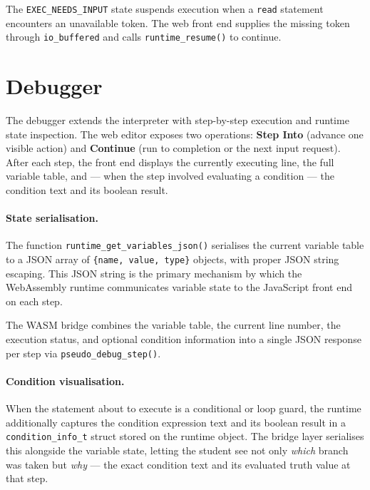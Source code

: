 The \texttt{EXEC\_NEEDS\_INPUT} state suspends execution when a \texttt{read}
statement encounters an unavailable token.  The web front end supplies the
missing token through \texttt{io\_buffered} and calls \texttt{runtime\_resume()}
to continue.

\section{Debugger}
\label{sec:debugger}

The debugger extends the interpreter with step-by-step execution and runtime
state inspection.  The web editor exposes two operations:
\textbf{Step Into} (advance one visible action) and \textbf{Continue} (run to
completion or the next input request).  After each step, the front end displays
the currently executing line, the full variable table, and --- when the step
involved evaluating a condition --- the condition text and its boolean result.

\paragraph{State serialisation.}
The function \texttt{runtime\_get\_variables\_json()} serialises the current
variable table to a JSON array of \texttt{\{name, value, type\}} objects, with
proper JSON string escaping.  This JSON string is the primary mechanism by
which the WebAssembly runtime communicates variable state to the JavaScript
front end on each step.

The WASM bridge combines the variable table, the current line number, the
execution status, and optional condition information into a single JSON
response per step via \texttt{pseudo\_debug\_step()}.

\paragraph{Condition visualisation.}
When the statement about to execute is a conditional or loop guard, the runtime
additionally captures the condition expression text and its boolean result in a
\texttt{condition\_info\_t} struct stored on the runtime object.  The bridge
layer serialises this alongside the variable state, letting the student see not
only \textit{which} branch was taken but \textit{why} --- the exact condition
text and its evaluated truth value at that step.

